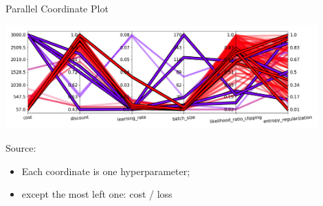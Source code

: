 \begin{frame}[c]{Parallel Coordinate Plot }

\centering
\includegraphics[width=0.9\textwidth]{images/parallel_coordinates_linear_cost_log_sampling_100}
\begin{flushright}
	Source:  
\end{flushright}

\begin{itemize}
	\item Each coordinate is one hyperparameter; 
	\item except the most left one: cost / loss
\end{itemize}




\end{frame}

